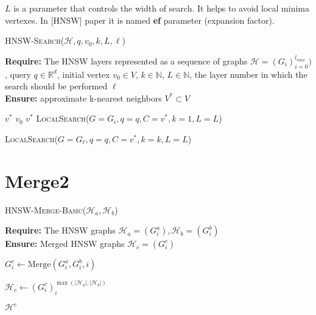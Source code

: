 \documentclass{article}
\begin{document}
$L$ is a parameter that controls the width of search. 
It helps to avoid local minima vertexes. In [HNSW] paper it is named \textbf{ef} parameter (expansion factor). 



\begin{algorithm}
\caption{\textsc{HNSW-Search}($\mathcal{H}, q, v_0, k, L, \ell $)}\label{alg:hnsw_search}
\textbf{Require:} The HNSW layers represented as  a sequence of graphs $\mathcal{H} = (G_i)_{i=0}^{l_{max}} )$, query $q \in \mathbb{R}^d$, initial vertex $v_0 \in V$,  $k \in \mathbb{N}$, $L \in \mathbb{N}$, the layer number in which the search should be performed $\ell$ \\    
\textbf{Ensure:} approximate k-nearest neighbors $V^* \subset V$
\begin{algorithmic}[1]

\State $v^*$ \gets $v_0$ 
    \State $v^*$ \gets \textsc{LocalSearch}($G=G_i, q=q, C={v^*}, k=1, L=L$)
\EndFor

\State \Return \textsc{LocalSearch}($ G=G_{\ell}, q=q, C={v^*}, k=k, L=L$)
\end{algorithmic}
\end{algorithm}


\section{Merge2}




\begin{algorithm}
\caption{\textsc{HNSW-Merge-Basic}($\mathcal{H}_a, \mathcal{H}_b$)}\label{alg:general_merge}
\textbf{Require:} The HNSW graphs $\mathcal{H}_a = (G^a_i), \mathcal{H}_b = (G^b_i)$ \\
\textbf{Ensure:}  Merged HNSW graphs $\mathcal{H}_c = (G^c_i)$ 
\begin{algorithmic}[1]


    \State $G^c_i \gets \text{Merge}(G^a_i, G^b_i, i)$
\EndFor

\State $\mathcal{H}_c \gets (G^c_i)_i^{\max(|\mathcal{H}_a|, |\mathcal{H}_b|)}$

\State \Return $\mathcal{H}^c$
\end{algorithmic}
\end{algorithm}
\end{document}
